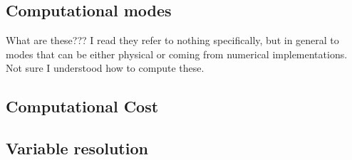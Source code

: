 \subsection{Computational modes}
What are these??? I read they refer to nothing specifically, but in general to modes that can be either physical or coming from numerical implementations. Not sure I understood how to compute these.

\subsection{Computational Cost}

\subsection{Variable resolution}

